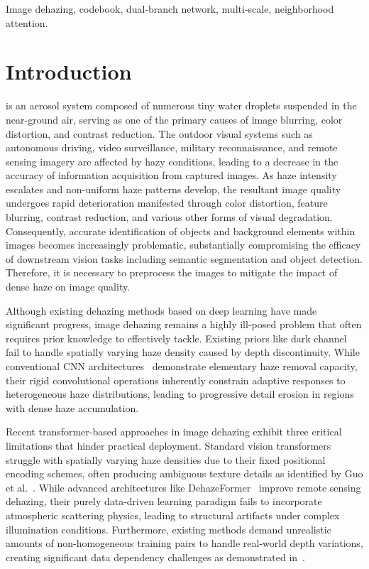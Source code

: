 \documentclass[journal]{IEEEtran}
\begin{document}
\begin{IEEEkeywords}
	Image dehazing, codebook, dual-branch network, multi-scale, neighborhood attention.
\end{IEEEkeywords}


\section{Introduction}
 is an aerosol system composed of numerous tiny water droplets suspended in the near-ground air, serving as one of the primary causes of image blurring, color distortion, and contrast reduction. The outdoor visual systems such as autonomous driving, video surveillance, military reconnaissance, and remote sensing imagery are affected by hazy conditions, leading to a decrease in the accuracy of information acquisition from captured images. As haze intensity escalates and non-uniform haze patterns develop, the resultant image quality undergoes rapid deterioration manifested through color distortion, feature blurring, contrast reduction, and various other forms of visual degradation. Consequently, accurate identification of objects and background elements within images becomes increasingly problematic, substantially compromising the efficacy of downstream vision tasks including semantic segmentation and object detection. Therefore, it is necessary to preprocess the images to mitigate the impact of dense haze on image quality.

Although existing dehazing methods based on deep learning have made significant progress, image dehazing remains a highly ill-posed problem that often requires prior knowledge to effectively tackle. Existing priors like dark channel~\cite{he2010single} fail to handle spatially varying haze density caused by depth discontinuity. While conventional CNN architectures~\cite{cai2016dehazenet, li2017aod, yu2021two} demonstrate elementary haze removal capacity, their rigid convolutional operations inherently constrain adaptive responses to heterogeneous haze distributions, leading to progressive detail erosion in regions with dense haze accumulation.

Recent transformer-based approaches in image dehazing exhibit three critical limitations that hinder practical deployment. Standard vision transformers struggle with spatially varying haze densities due to their fixed positional encoding schemes, often producing ambiguous texture details as identified by Guo et al.~\cite{guo2022image}. While advanced architectures like DehazeFormer~\cite{song2023vision} improve remote sensing dehazing, their purely data-driven learning paradigm fails to incorporate atmospheric scattering physics, leading to structural artifacts under complex illumination conditions. Furthermore, existing methods demand unrealistic amounts of non-homogeneous training pairs to handle real-world depth variations, creating significant data dependency challenges as demonstrated in~\cite{liu2023data}.
\end{document}
